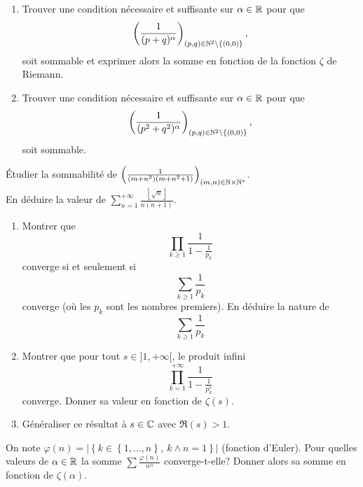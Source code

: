\documentclass[12pt]{article}
\begin{document}
\begin{exercise}
	\phantom{}
	\begin{enumerate}
		\item
		Trouver une condition nécessaire et suffisante sur $\alpha\in\mathbb{R}$ pour que
		\begin{equation*}
			\left(\frac{1}{(p+q)^{\alpha}}\right)_{(p,q)\in\mathbb{N}^{2}\setminus\{(0,0)\}},
		\end{equation*}
		soit sommable et exprimer alors la somme en fonction de la fonction
		$\zeta$ de Riemann.
		\item
		Trouver une condition nécessaire et suffisante sur $\alpha\in\mathbb{R}$ pour que
		\begin{equation*}
			\left(\frac{1}{(p^{2}+q^{2})^{\alpha}}\right)_{(p,q)\in\mathbb{N}^{2}\setminus\{(0,0)\}},
		\end{equation*}
		soit sommable.
	\end{enumerate}
\end{exercise}

\begin{exercise}
	Étudier la sommabilité de
	$\Bigl(\frac{1}{(m+n^{2})(m+n^{2}+1)}\Bigr)_{(m,n)\in\mathbb{N}\times\mathbb{N}^{*}}$.\\
	En déduire la valeur de $\sum_{n=1}^{+\infty}\frac{\left\lfloor\sqrt{n}\right\rfloor}{n(n+1)}$.
\end{exercise}

\begin{exercise}
	\phantom{}
	\begin{enumerate}
		\item Montrer que 
		$$\prod_{k\geqslant1}\frac{1}{1-\frac{1}{p_{k}}}$$ 
		converge si et seulement si 
		$$\sum_{k\geqslant 1}\frac{1}{p_{k}}$$ 
		converge (où les $p_{k}$ sont les nombres premiers). En déduire la nature de 
		$$\sum_{k\geqslant1}\frac{1}{p_{k}}$$
		\item
		Montrer que pour tout $s\in]1,+\infty[$, le produit infini
		$$\prod_{k=1}^{+\infty}\frac{1}{1-\frac{1}{p_{k}^{s}}}$$ 
		converge. Donner sa valeur en fonction de
		$\zeta(s)$.
		\item
		Généraliser ce résultat à $s\in\mathbb{C}$ avec $\Re(s)>1$.
	\end{enumerate}
\end{exercise}

\begin{exercise}
	On note $\varphi(n)=\left\vert\left\{k\in\left\{1,\dots,n\right\},~k\wedge n=1\right\}\right\vert$ (fonction
	d'Euler). Pour quelles valeurs de $\alpha\in\mathbb{R}$ la somme $\sum
	\frac{\varphi(n)}{n^{\alpha}}$ converge-t-elle? Donner alors sa somme en
	fonction de $\zeta(\alpha)$.
\end{exercise}
\end{document}
